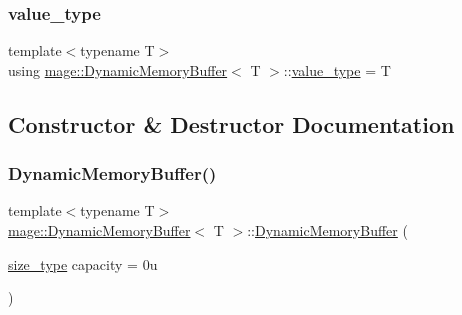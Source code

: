 \mbox{\label{classmage_1_1_dynamic_memory_buffer_a951f47f06268fe148ed617d17cad6150}} 
\subsubsection{\texorpdfstring{value\+\_\+type}{value\_type}}
{\footnotesize\ttfamily template$<$typename T$>$ \\
using \mbox{\hyperlink{classmage_1_1_dynamic_memory_buffer}{mage\+::\+Dynamic\+Memory\+Buffer}}$<$ T $>$\+::\mbox{\hyperlink{classmage_1_1_dynamic_memory_buffer_a951f47f06268fe148ed617d17cad6150}{value\+\_\+type}} =  T}



\subsection{Constructor \& Destructor Documentation}
\mbox{\label{classmage_1_1_dynamic_memory_buffer_a11e13ff173e7048ba05e2c576b9fa3b5}} 
\subsubsection{\texorpdfstring{Dynamic\+Memory\+Buffer()}{DynamicMemoryBuffer()}\hspace{0.1cm}{\footnotesize\ttfamily [1/3]}}
{\footnotesize\ttfamily template$<$typename T$>$ \\
\mbox{\hyperlink{classmage_1_1_dynamic_memory_buffer}{mage\+::\+Dynamic\+Memory\+Buffer}}$<$ T $>$\+::\mbox{\hyperlink{classmage_1_1_dynamic_memory_buffer}{Dynamic\+Memory\+Buffer}} (\begin{DoxyParamCaption}\item[{\mbox{\hyperlink{classmage_1_1_dynamic_memory_buffer_a45d02825da2b18fd7c24965ed5f46a30}{size\+\_\+type}}}]{capacity = {\ttfamily 0u} }\end{DoxyParamCaption})\hspace{0.3cm}{\ttfamily [explicit]}}


